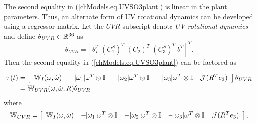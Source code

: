 The second equality in (\ref{chModels.eq.UVSO3plant}) is linear in the
plant parameters. Thus, an alternate form of \ac{UV} rotational
dynamics can be developed using a regressor matrix.  Let the $UVR$
subscript denote {\it\ac{UV} rotational dynamics}
%
%
and define $\theta_{UVR}\in\mathbb{R}^{36}$ as 
%
%
\begin{equation}\label{chModels.eq.paramVecUVR}
\theta_{UVR}=\left[\theta_I^T\; (C_1^S)^T\; (C_2)^T \; (C_3^S)^T \; b^T\right]^T.
\end{equation}
%
Then the second equality in (\ref{chModels.eq.UVSO3plant}) can be factored as
%
\begin{widetext}
\begin{align}
  \tau(t)&= \left[ \begin{array}{ccccc} 
 \mathbb{W}_{I}(\omega,\dot{\omega})              &
-|\omega_1|\omega^T \otimes \mathbb{I} &
-|\omega_2|\omega^T \otimes \mathbb{I} &
-|\omega_3|\omega^T \otimes \mathbb{I} &
\mathcal{J}(R^T e_3)\\ \end{array} \right] \theta_{UVR}        \nonumber \\
      &=\mathbb{W}_{UVR}(\omega,\dot{\omega},R) \theta_{UVR}               \label{chModels.eq.UVSO3_LS} 
\end{align}
%
where
%
\begin{equation}
\mathbb{W}_{UVR}=\left[ \begin{array}{ccccc} 
 \mathbb{W}_{I}(\omega,\dot{\omega})              &
-|\omega_1|\omega^T \otimes \mathbb{I} &
-|\omega_2|\omega^T \otimes \mathbb{I} &
-|\omega_3|\omega^T \otimes \mathbb{I} &
\mathcal{J}(R^T e_3)\\ \end{array} \right].
\end{equation}
\end{widetext}
